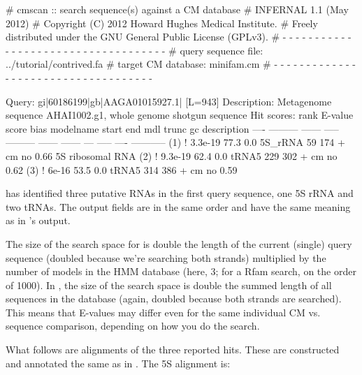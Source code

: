 \begin{sreoutput}
# cmscan :: search sequence(s) against a CM database
# INFERNAL 1.1 (May 2012)
# Copyright (C) 2012 Howard Hughes Medical Institute.
# Freely distributed under the GNU General Public License (GPLv3).
# - - - - - - - - - - - - - - - - - - - - - - - - - - - - - - - - - - - -
# query sequence file:                   ../tutorial/contrived.fa
# target CM database:                    minifam.cm
# - - - - - - - - - - - - - - - - - - - - - - - - - - - - - - - - - - - -

Query:       gi|60186199|gb|AAGA01015927.1|  [L=943]
Description: Metagenome sequence AHAI1002.g1, whole genome shotgun sequence
Hit scores:
 rank     E-value  score  bias  modelname  start    end   mdl trunc   gc  description
 ----   --------- ------ -----  --------- ------ ------   --- ----- ----  -----------
  (1) !   3.3e-19   77.3   0.0  5S_rRNA       59    174 +  cm    no 0.66  5S ribosomal RNA
  (2) !   9.3e-19   62.4   0.0  tRNA5        229    302 +  cm    no 0.62  
  (3) !     6e-16   53.5   0.0  tRNA5        314    386 +  cm    no 0.59  
\end{sreoutput}

 has identified three putative RNAs in the first query
sequence, one 5S rRNA and two tRNAs. The output fields are in the
same order and have the same meaning as in 's output.

The size of the search space for  is double the length of
the current (single) query sequence (doubled because we're searching
both strands) multiplied by the number of models in the HMM database
(here, 3; for a Rfam search, on the order of 1000). In
, the size of the search space is double the summed
length of all sequences in the database (again, doubled because both
strands are searched). This means that E-values may differ even for
the same individual CM vs. sequence comparison, depending on how you
do the search.

What follows are alignments of the three reported hits. These are
constructed and annotated the same as in . The 5S
alignment is: 

